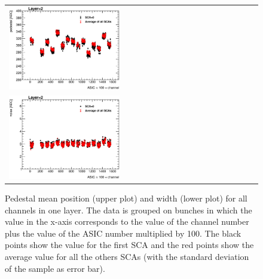 \documentclass[final,3p,times,twocolumn]{elsarticle}
\begin{document}
\begin{figure}[!t]
  \centering
  \begin{tabular}{l}
    \includegraphics[width=0.45\textwidth]{../figs/pedestal/ped_mean_layer2.eps} \\
    \includegraphics[width=0.45\textwidth]{../figs/pedestal/width_mean_layer2.eps}
  \end{tabular}
  \caption{Pedestal mean position (upper plot) and width (lower plot) for all channels in one layer. The data is grouped on bunches in which the value in the x-axis
    corresponds to the value of the channel number plus the value of the ASIC number multiplied by 100. The black points show the value for the first SCA
    and the red points show the average value for all the others SCAs (with the standard deviation of the sample as error bar).}
\label{pedestal_layer}
\end{figure}
\end{document}

